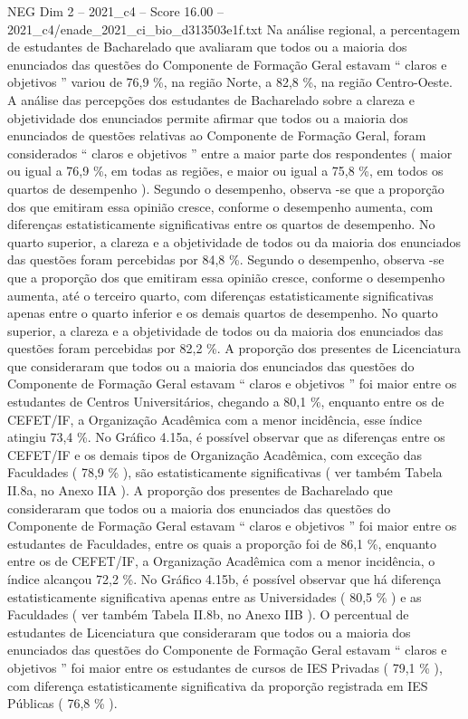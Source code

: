 \begin{textsample}{NEG Dim 2 – 2021\_c4 – Score 16.00 – 2021\_c4/enade\_2021\_ci\_bio\_d313503e1f.txt}
Na análise regional, a percentagem de estudantes de Bacharelado que avaliaram que todos ou a maioria dos enunciados das questões do Componente de Formação Geral estavam “ claros e objetivos ” variou de 76,9 \%, na região Norte, a 82,8 \%, na região Centro-Oeste.
A análise das percepções dos estudantes de Bacharelado sobre a clareza e objetividade dos enunciados permite afirmar que todos ou a maioria dos enunciados de questões relativas ao Componente de Formação Geral, foram considerados “ claros e objetivos ” entre a maior parte dos respondentes ( maior ou igual a 76,9 \%, em todas as regiões, e maior ou igual a 75,8 \%, em todos os quartos de desempenho ).
Segundo o desempenho, observa -se que a proporção dos que emitiram essa opinião cresce, conforme o desempenho aumenta, com diferenças estatisticamente significativas entre os quartos de desempenho.
No quarto superior, a clareza e a objetividade de todos ou da maioria dos enunciados das questões foram percebidas por 84,8 \%.
Segundo o desempenho, observa -se que a proporção dos que emitiram essa opinião cresce, conforme o desempenho aumenta, até o terceiro quarto, com diferenças estatisticamente significativas apenas entre o quarto inferior e os demais quartos de desempenho.
No quarto superior, a clareza e a objetividade de todos ou da maioria dos enunciados das questões foram percebidas por 82,2 \%.
A proporção dos presentes de Licenciatura que consideraram que todos ou a maioria dos enunciados das questões do Componente de Formação Geral estavam “ claros e objetivos ” foi maior entre os estudantes de Centros Universitários, chegando a 80,1 \%, enquanto entre os de CEFET/IF, a Organização Acadêmica com a menor incidência, esse índice atingiu 73,4 \%.
No Gráfico 4.15a, é possível observar que as diferenças entre os CEFET/IF e os demais tipos de Organização Acadêmica, com exceção das Faculdades ( 78,9 \% ), são estatisticamente significativas ( ver também Tabela II.8a, no Anexo IIA ).
A proporção dos presentes de Bacharelado que consideraram que todos ou a maioria dos enunciados das questões do Componente de Formação Geral estavam “ claros e objetivos ” foi maior entre os estudantes de Faculdades, entre os quais a proporção foi de 86,1 \%, enquanto entre os de CEFET/IF, a Organização Acadêmica com a menor incidência, o índice alcançou 72,2 \%.
No Gráfico 4.15b, é possível observar que há diferença estatisticamente significativa apenas entre as Universidades ( 80,5 \% ) e as Faculdades ( ver também Tabela II.8b, no Anexo IIB ).
O percentual de estudantes de Licenciatura que consideraram que todos ou a maioria dos enunciados das questões do Componente de Formação Geral estavam “ claros e objetivos ” foi maior entre os estudantes de cursos de IES Privadas ( 79,1 \% ), com diferença estatisticamente significativa da proporção registrada em IES Públicas ( 76,8 \% ).

\end{textsample}
